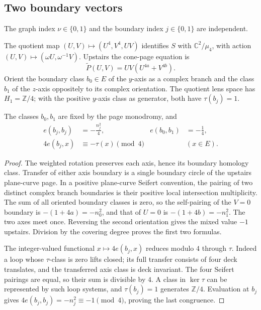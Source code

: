 \subsection{Two boundary vectors}\label{subsec:arith-boundary}
The graph index \(\nu\in\{0,1\}\) and the boundary index
\(j\in\{0,1\}\) are independent.

The quotient map $(U,V)\mapsto(U^4,V^4,UV)$ identifies $S$ with
$\mathbb C^2/\mu_4$, with action $(U,V)\mapsto(\omega U,\omega^{-1}V)$.
Upstairs the cone-page equation is
\begin{equation}\label{eq:arith-upstairs-page}
 \widetilde P(U,V)=UV(U^{4a}+V^{4b}).
\end{equation}
Orient the boundary class $b_0\in E$ of the $y$-axis as a complex
branch and the class $b_1$ of the $z$-axis oppositely to its complex
orientation.  The quotient lens space has $H_1=\mathbb Z/4$; with the
positive $y$-axis class as generator, both have $\tau(b_j)=1$.

\begin{lemma}\label{lem:arith-boundary}
The classes $b_0,b_1$ are fixed by the page monodromy, and
\begin{equation}\label{eq:arith-boundary-pairings}
 \begin{aligned}
 e(b_j,b_j)&=-\frac{n_j^2}{4},&
 e(b_0,b_1)&=-\frac14,\\
 4e(b_j,x)&\equiv-\tau(x)\pmod4&&(x\in E).
 \end{aligned}
\end{equation}
\end{lemma}

\begin{proof}
The weighted rotation preserves each axis, hence its boundary homology
class.  Transfer of either axis boundary is a single boundary circle of
the upstairs plane-curve page.  In a positive plane-curve Seifert
convention, the pairing of two distinct complex branch boundaries is their
positive local intersection multiplicity.  The sum of all oriented
boundary classes is zero, so the self-pairing of the $V=0$ boundary is
$-(1+4a)=-n_0^2$, and that of $U=0$ is $-(1+4b)=-n_1^2$.
The two axes meet once.  Reversing the second orientation gives the
mixed value $-1$ upstairs.  Division by the covering degree proves the
first two formulas.

The integer-valued functional $x\mapsto4e(b_j,x)$ reduces modulo $4$
through $\tau$.  Indeed a loop whose $\tau$-class is zero lifts closed;
its full transfer consists of four deck translates, and the transferred
axis class is deck invariant.  The four Seifert pairings are equal, so
their sum is divisible by $4$.  A class in $\ker\tau$ can be represented
by such loop systems, and $\tau(b_j)=1$ generates $\mathbb Z/4$.
Evaluation at $b_j$ gives $4e(b_j,b_j)=-n_j^2\equiv-1\pmod4$,
proving the last congruence.
\end{proof}

